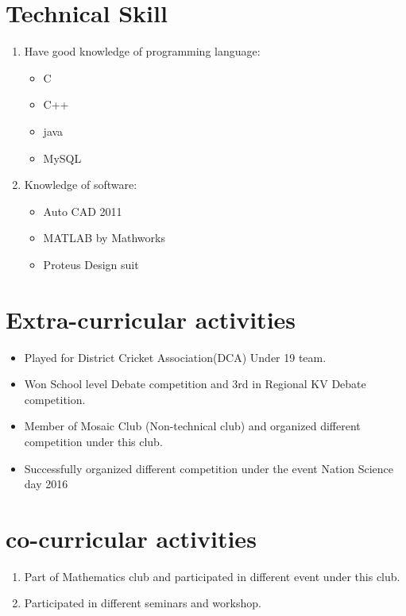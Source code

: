 \documentclass[11pt,a4paper]{article}
\begin{document}
\section*{Technical Skill}
\vspace{-0.7em}\hline \vspace{1.5em}
\begin{enumerate}
\item Have good knowledge of programming language:
\begin{itemize}
\item C
\item C++
\item java
\item MySQL
\end{itemize}
\item Knowledge of software:
\begin{itemize}
\item Auto CAD 2011
\item MATLAB by Mathworks
\item Proteus Design suit
\end{itemize}
\end{enumerate}

\section*{Extra-curricular activities}
\vspace{-0.7em}\hline \vspace{1.5em}
\begin{itemize}
\item Played for District Cricket Association(DCA) Under 19 team.
\item Won School level Debate competition and 3rd in Regional KV Debate competition.
\item Member of Mosaic Club (Non-technical club) and organized different competition under this club.
\item Successfully organized different competition under the event Nation Science day 2016
\end{itemize}
\section*{co-curricular activities}
\vspace{-0.7em}\hline \vspace{1.5em}
\begin{enumerate}
\item Part of Mathematics club and participated in different event under this club.
\item Participated in different seminars and workshop.

\end{enumerate}
\end{document}
